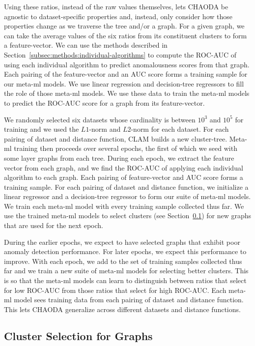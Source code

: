 Using these ratios, instead of the raw values themselves, lets CHAODA be agnostic to dataset-specific properties and, instead, only consider how those properties change as we traverse the tree and/or a graph.
For a given graph, we can take the average values of the six ratios from its constituent clusters to form a feature-vector.
We can use the methods described in Section~\ref{subsec:methods:individual-algorithms} to compute the ROC-AUC of using each individual algorithm to predict anomalousness scores from that graph.
Each pairing of the feature-vector and an AUC score forms a training sample for our meta-ml models.
We use linear regression and decision-tree regressors to fill the role of those meta-ml models.
We use these data to train the meta-ml models to predict the ROC-AUC score for a graph from its feature-vector.

We randomly selected six datasets whose cardinality is between $10^3$ and $10^5$ for training and we used the $L1$-norm and $L2$-norm for each dataset.
For each pairing of dataset and distance function, CLAM builds a new cluster-tree.
Meta-ml training then proceeds over several epochs, the first of which we seed with some layer graphs from each tree.
During each epoch, we extract the feature vector from each graph, and we find the ROC-AUC of applying each individual algorithm to each graph.
Each pairing of feature-vector and AUC score forms a training sample.
For each pairing of dataset and distance function, we initialize a linear regressor and a decision-tree regressor to form our suite of meta-ml models.
We train each meta-ml model with every training sample collected thus far.
We use the trained meta-ml models to select clusters (see Section~\ref{subsec:methods:cluster-selection-for-graphs}) for new graphs that are used for the next epoch.

During the earlier epochs, we expect to have selected graphs that exhibit poor anomaly detection performance.
For later epochs, we expect this performance to improve.
With each epoch, we add to the set of training samples collected thus far and we train a new suite of meta-ml models for selecting better clusters.
This is so that the meta-ml models can learn to distinguish between ratios that select for low ROC-AUC from those ratios that select for high ROC-AUC.
Each meta-ml model sees training data from each pairing of dataset and distance function.
This lets CHAODA generalize across different datasets and distance functions.


\subsection{Cluster Selection for Graphs}
\label{subsec:methods:cluster-selection-for-graphs}

